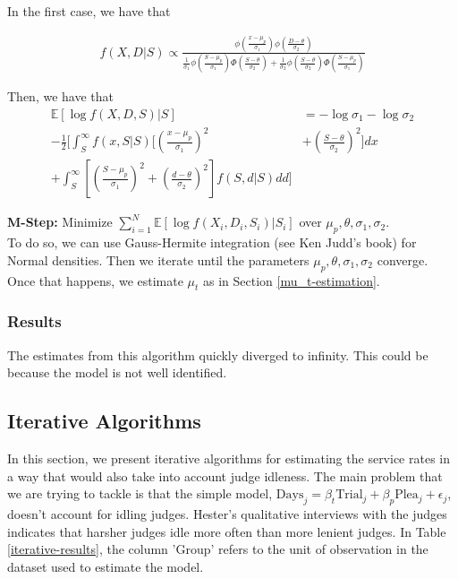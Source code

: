 \documentclass[11pt, oneside]{article}   	%
\theoremstyle{ModifiedStyle}
\begin{document}
			In the first case, we have that

			\begin{align}
				f(X,D|S) \propto \frac{\phi(\frac{x-\mu_p}{\sigma_1}) \phi(\frac{D-\theta}{\sigma_2})}{\frac{1}{\sigma_1} \phi(\frac{S-\mu_p}{\sigma_1}) \Phi(\frac{S-\theta}{\sigma_2}) + \frac{1}{\sigma_2} \phi(\frac{S-\theta}{\sigma_2}) \Phi(\frac{S-\mu_p}{\sigma_1})}
			\end{align}

			Then, we have that
			\begin{align*}
				\mathbb{E}[\log f(X,D,S) | S] &= -\log \sigma_1 - \log \sigma_2 \\
				-\frac{1}{2}[\int_S^\infty f(x,S|S)[(\frac{x-\mu_p}{\sigma_1})^2 &+ (\frac{S-\theta}{\sigma_2})^2]dx \\
				+ \int_S^\infty [(\frac{S-\mu_p}{\sigma_1})^2 + (\frac{d-\theta}{\sigma_2})^2]f(S,d|S) dd]
			\end{align*}

			\noindent \textbf{M-Step:} Minimize $\sum_{i=1}^N \mathbb{E}[\log f(X_i,D_i,S_i)|S_i]$ over $\mu_p,\theta,\sigma_1,\sigma_2$. \\
			To do so, we can use Gauss-Hermite integration (see Ken Judd's book) for Normal densities. Then we iterate until the parameters $\mu_p,\theta,\sigma_1,\sigma_2$ converge. Once that happens, we estimate $\mu_t$ as in Section \ref{mu_t-estimation}.

		\subsubsection{Results}
		  The estimates from this algorithm quickly diverged to infinity. This could be because the model is not well identified.

	\subsection{Iterative Algorithms}
	  In this section, we present iterative algorithms for estimating the service rates in a
		way that would also take into account judge idleness.
	  The main problem that we are trying to tackle is that the simple model, $\text{Days}_j = \beta_t \text{Trial}_j + \beta_p\text{Plea}_j +\epsilon_j$, doesn't account for idling judges. Hester's qualitative interviews with the judges indicates that harsher judges idle more often than more lenient judges. In Table \ref{iterative-results}, the column 'Group' refers to the unit of observation in the dataset used to estimate the model.
\end{document}
